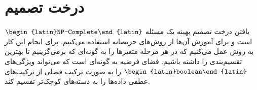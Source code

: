 \section{درخت تصمیم}

یافتن درخت تصمیم بهینه یک مسئله $\text{\begin{latin}NP-Complete\end{latin}}$ است و برای آموزش آن‌ها از روش‌های حریصانه استفاده می‌کنیم.
برای انجام این کار به روش عمل می‌کنیم که در هر مرحله متغیرها را به گونه‌ای که برمی‌گزینیم تا بهترین تقسیم‌بندی را داشته باشیم. فضای فرضیه به گونه‌ای است که می‌تواند ویژگی‌های $\text{\begin{latin}boolean\end{latin}}$ را به صورت ترکیب فصلی از ترکیب‌های عطفی داده‌ها را به دسته‌های کوچک‌تر تفسیم کند. 


